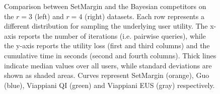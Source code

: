 \documentclass{article}
\renewcommand\[{\begin{equation}}
\renewcommand\]{\end{equation}}
\begin{document}
\begin{figure}[b]
{\begin{tabular}{cccc}
        \\
        \hline
    \end{tabular}
    }
    \caption{\label{fig:comparison} Comparison between {\sc SetMargin}
      and the Bayesian competitors on the $r=3$ (left) and $r=4$
      (right) datasets. Each row represents a different distribution
      for sampling the underlying user utility.  The x-axis reports
      the number of iterations (i.e. pairwise queries), while the
      y-axis reports the utility loss (first and third columns) and
      the cumulative time in seconds (second and fourth
      columns). Thick lines indicate median values over all users,
      while standard deviations are shown as shaded areas. Curves
      represent {\sc SetMargin} (orange), Guo (blue), Viappiani QI
      (green) and Viappiani EUS (gray) respectively.}
\end{figure}
\end{document}
